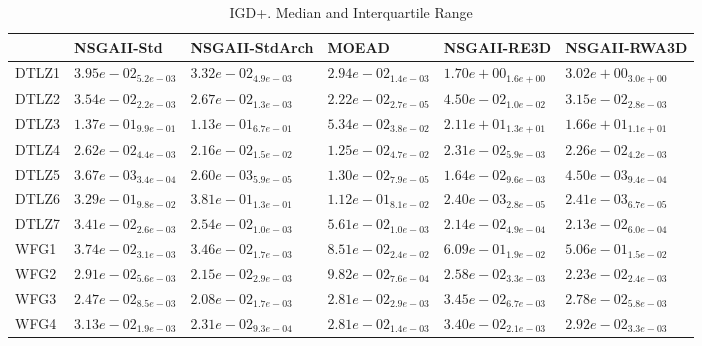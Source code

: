 \documentclass{article}
\begin{document}
\begin{table}
\caption{IGD+. Median and Interquartile Range}
\label{table: IGD+}
\centering
\begin{scriptsize}
\begin{tabular}{llllll}
\hline & NSGAII-Std & NSGAII-StdArch & MOEAD & NSGAII-RE3D &  NSGAII-RWA3D\\
\hline 
DTLZ1 & $  3.95e-02_{ 5.2e-03}$ & \cellcolor{gray25}$  3.32e-02_{ 4.9e-03}$ & \cellcolor{gray95}$  2.94e-02_{ 1.4e-03}$ & $  1.70e+00_{ 1.6e+00}$ & $  3.02e+00_{ 3.0e+00}$ \\
DTLZ2 & $  3.54e-02_{ 2.2e-03}$ & \cellcolor{gray25}$  2.67e-02_{ 1.3e-03}$ & \cellcolor{gray95}$  2.22e-02_{ 2.7e-05}$ & $  4.50e-02_{ 1.0e-02}$ & $  3.15e-02_{ 2.8e-03}$ \\
DTLZ3 & $  1.37e-01_{ 9.9e-01}$ & \cellcolor{gray25}$  1.13e-01_{ 6.7e-01}$ & \cellcolor{gray95}$  5.34e-02_{ 3.8e-02}$ & $  2.11e+01_{ 1.3e+01}$ & $  1.66e+01_{ 1.1e+01}$ \\
DTLZ4 & $  2.62e-02_{ 4.4e-03}$ & \cellcolor{gray25}$  2.16e-02_{ 1.5e-02}$ & \cellcolor{gray95}$  1.25e-02_{ 4.7e-02}$ & $  2.31e-02_{ 5.9e-03}$ & $  2.26e-02_{ 4.2e-03}$ \\
DTLZ5 & \cellcolor{gray25}$  3.67e-03_{ 3.4e-04}$ & \cellcolor{gray95}$  2.60e-03_{ 5.9e-05}$ & $  1.30e-02_{ 7.9e-05}$ & $  1.64e-02_{ 9.6e-03}$ & $  4.50e-03_{ 9.4e-04}$ \\
DTLZ6 & $  3.29e-01_{ 9.8e-02}$ & $  3.81e-01_{ 1.3e-01}$ & $  1.12e-01_{ 8.1e-02}$ & \cellcolor{gray95}$  2.40e-03_{ 2.8e-05}$ & \cellcolor{gray25}$  2.41e-03_{ 6.7e-05}$ \\
DTLZ7 & $  3.41e-02_{ 2.6e-03}$ & $  2.54e-02_{ 1.0e-03}$ & $  5.61e-02_{ 1.0e-03}$ & \cellcolor{gray25}$  2.14e-02_{ 4.9e-04}$ & \cellcolor{gray95}$  2.13e-02_{ 6.0e-04}$ \\
WFG1 & \cellcolor{gray25}$  3.74e-02_{ 3.1e-03}$ & \cellcolor{gray95}$  3.46e-02_{ 1.7e-03}$ & $  8.51e-02_{ 2.4e-02}$ & $  6.09e-01_{ 1.9e-02}$ & $  5.06e-01_{ 1.5e-02}$ \\
WFG2 & $  2.91e-02_{ 5.6e-03}$ & \cellcolor{gray95}$  2.15e-02_{ 2.9e-03}$ & $  9.82e-02_{ 7.6e-04}$ & $  2.58e-02_{ 3.3e-03}$ & \cellcolor{gray25}$  2.23e-02_{ 2.4e-03}$ \\
WFG3 & \cellcolor{gray25}$  2.47e-02_{ 8.5e-03}$ & \cellcolor{gray95}$  2.08e-02_{ 1.7e-03}$ & $  2.81e-02_{ 2.9e-03}$ & $  3.45e-02_{ 6.7e-03}$ & $  2.78e-02_{ 5.8e-03}$ \\
WFG4 & $  3.13e-02_{ 1.9e-03}$ & \cellcolor{gray95}$  2.31e-02_{ 9.3e-04}$ & \cellcolor{gray25}$  2.81e-02_{ 1.4e-03}$ & $  3.40e-02_{ 2.1e-03}$ & $  2.92e-02_{ 3.3e-03}$ \\

\end{tabular}
\end{scriptsize}
\end{table}
\end{document}
